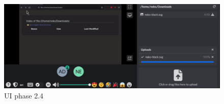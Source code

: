\begin{figure}
	\centering
	\includegraphics[width=15cm]{images/ui24.png}
	\caption{UI phase 2.4}
	\label{fig:form}
\end{figure}

